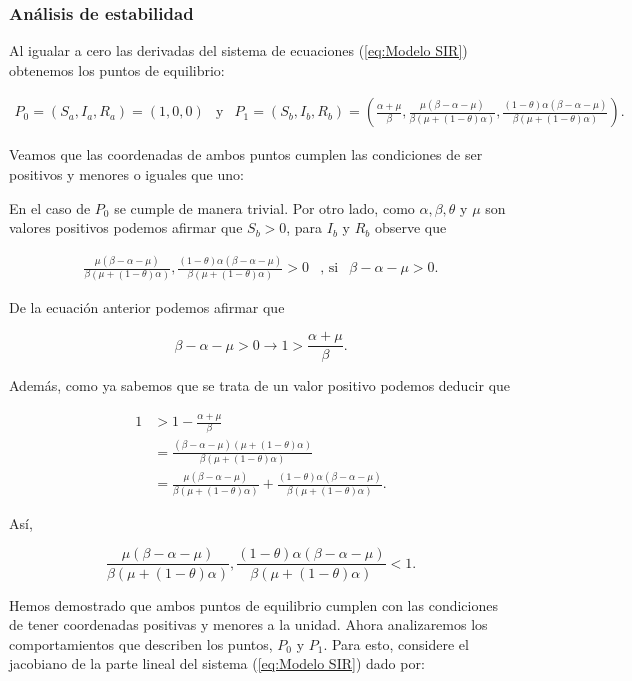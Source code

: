 \subsubsection{Análisis de estabilidad}

Al igualar a cero las derivadas del sistema de ecuaciones (\ref{eq:Modelo SIR}) obtenemos los puntos de equilibrio:

$$\begin{array}{ccc}
P_0=(S_a,I_a,R_a)=(1,0,0) & \text{y} & P_1=(S_b,I_b,R_b)=\left(\frac{\alpha+\mu}{\beta},\frac{\mu(\beta-\alpha-\mu)}{\beta(\mu+(1-\theta)\alpha)},\frac{(1-\theta)\alpha(\beta-\alpha-\mu)}{\beta(\mu+(1-\theta)\alpha)}\right).
\end{array}$$

Veamos que las coordenadas de ambos puntos cumplen las condiciones de ser positivos y menores o iguales que uno: 

En el caso de $P_0$ se cumple de manera trivial. Por otro lado, como $\alpha,\beta,\theta$ y $\mu$ son valores positivos podemos afirmar que $S_b>0$, para $I_b$ y $R_b$ observe que 

$$\begin{array}{ccc}
\frac{\mu(\beta-\alpha-\mu)}{\beta(\mu+(1-\theta)\alpha)},\frac{(1-\theta)\alpha(\beta-\alpha-\mu)}{\beta(\mu+(1-\theta)\alpha)}>0 & \text{, si} & \beta-\alpha-\mu>0.
\end{array}$$

De la ecuación anterior podemos afirmar que 

$$\beta-\alpha-\mu>0\longrightarrow1>\frac{\alpha+\mu}{\beta}.$$

Además, como ya sabemos que se trata de un valor positivo podemos deducir que 

\begin{align*}
1&>1-\frac{\alpha+\mu}{\beta} \\
&= \frac{(\beta-\alpha-\mu)(\mu+(1-\theta)\alpha)}{\beta(\mu+(1-\theta)\alpha)}\\
&= \frac{\mu(\beta-\alpha-\mu)}{\beta(\mu+(1-\theta)\alpha)}+\frac{(1-\theta)\alpha(\beta-\alpha-\mu)}{\beta(\mu+(1-\theta)\alpha)}.
\end{align*}

Así,

$$\frac{\mu(\beta-\alpha-\mu)}{\beta(\mu+(1-\theta)\alpha)},\frac{(1-\theta)\alpha(\beta-\alpha-\mu)}{\beta(\mu+(1-\theta)\alpha)}<1.$$

Hemos demostrado que ambos puntos de equilibrio cumplen con las condiciones de tener coordenadas positivas y menores a la unidad. Ahora analizaremos los comportamientos que describen los puntos, $P_0$ y $P_1$. Para esto, considere el jacobiano de la parte lineal del sistema (\ref{eq:Modelo SIR}) dado por:

